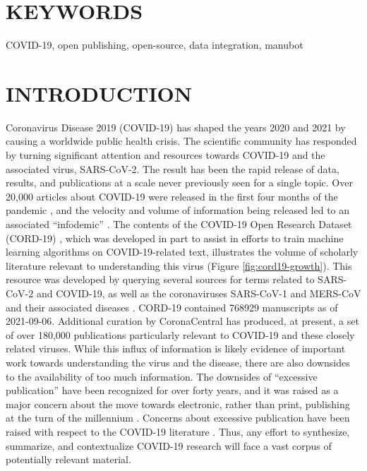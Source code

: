 \documentclass[twocolumn]{ceurart}
\begin{document}
\hypertarget{keywords}{%
\section*{KEYWORDS}\label{keywords}}

COVID-19, open publishing, open-source, data integration, manubot

\hypertarget{introduction}{%
\section{INTRODUCTION}\label{introduction}}

Coronavirus Disease 2019 (COVID-19) has shaped the years 2020 and 2021 by causing a worldwide public health crisis.
The scientific community has responded by turning significant attention and resources towards COVID-19 and the associated virus, SARS-CoV-2.
The result has been the rapid release of data, results, and publications at a scale never previously seen for a single topic.
Over 20,000 articles about COVID-19 were released in the first four months of the pandemic \citep{7ub6VM4Z}, and the velocity and volume of information being released led to an associated ``infodemic'' \citep{7ub6VM4Z, nnfOazAC}.
The contents of the COVID-19 Open Research Dataset (CORD-19) \citep{CiOwklc6}, which was developed in part to assist in efforts to train machine learning algorithms on COVID-19-related text, illustrates the volume of scholarly literature relevant to understanding this virus (Figure \ref{fig:cord19-growth}).
This resource was developed by querying several sources for terms related to SARS-CoV-2 and COVID-19, as well as the coronaviruses SARS-CoV-1 and MERS-CoV and their associated diseases \citep{CiOwklc6}.
CORD-19 contained 768929 manuscripts as of 2021-09-06.
Additional curation by CoronaCentral \citep{zQ1JIn2J} has produced, at present, a set of over 180,000 publications particularly relevant to COVID-19 and these closely related viruses.
While this influx of information is likely evidence of important work towards understanding the virus and the disease, there are also downsides to the availability of too much information.
The downsides of ``excessive publication'' have been recognized for over forty years, and it was raised as a major concern about the move towards electronic, rather than print, publishing at the turn of the millennium \citep{DfSr1Ohc}.
Concerns about excessive publication have been raised with respect to the COVID-19 literature \citep{dUvvJvv6}.
Thus, any effort to synthesize, summarize, and contextualize COVID-19 research will face a vast corpus of potentially relevant material.
\end{document}
